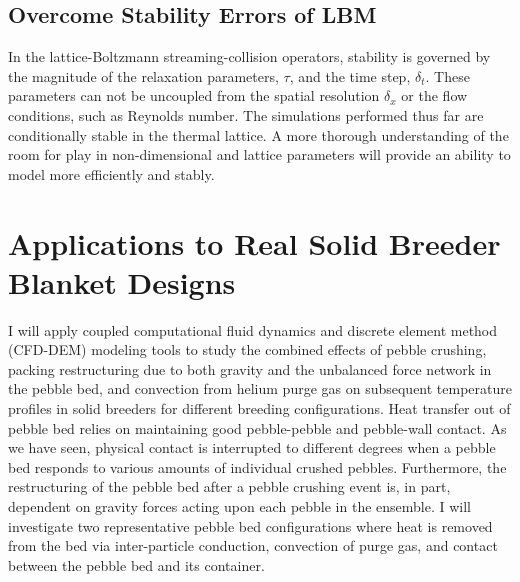 \subsection{Overcome Stability Errors of LBM}
In the lattice-Boltzmann streaming-collision operators, stability is governed by the magnitude of the relaxation parameters, $\tau$, and the time step, $\delta_t$. These parameters can not be uncoupled from the spatial resolution $\delta_x$ or the flow conditions, such as Reynolds number. The simulations performed thus far are conditionally stable in the thermal lattice. A more thorough understanding of the room for play in non-dimensional and lattice parameters will provide an ability to model more efficiently and stably. 




\section{Applications to Real Solid Breeder Blanket Designs}\label{sec:applied-studies}

I will apply coupled computational fluid dynamics and discrete element method (CFD-DEM) modeling tools to study the combined effects of pebble crushing, packing restructuring due to both gravity and the unbalanced force network in the pebble bed, and convection from helium purge gas on subsequent temperature profiles in solid breeders for different breeding configurations. Heat transfer out of pebble bed relies on maintaining good pebble-pebble and pebble-wall contact. As we have seen, physical contact is interrupted to different degrees when a pebble bed responds to various amounts of individual crushed pebbles. Furthermore, the restructuring of the pebble bed after a pebble crushing event is, in part, dependent on gravity forces acting upon each pebble in the ensemble. I will investigate two representative pebble bed configurations where heat is removed from the bed via inter-particle conduction, convection of purge gas, and contact between the pebble bed and its container.

